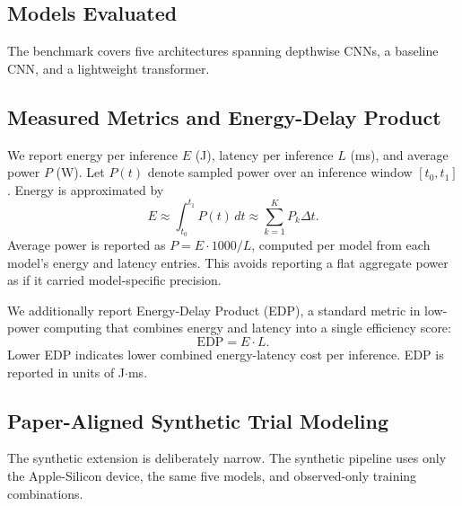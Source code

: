 \documentclass[conference]{IEEEtran}
\begin{document}
\subsection{Models Evaluated}
The benchmark covers five architectures spanning depthwise CNNs, a baseline
CNN, and a lightweight transformer.

\begin{table}[ht]
\centering
\caption{Architectures evaluated.}
\end{table}

\subsection{Measured Metrics and Energy-Delay Product}
We report energy per inference $E$ (J), latency per inference $L$ (ms), and
average power $P$ (W). Let $P(t)$ denote sampled power over an inference window
$[t_0, t_1]$. Energy is approximated by
\begin{equation}
E \approx \int_{t_0}^{t_1} P(t)\,dt \approx \sum_{k=1}^{K} P_k \Delta t.
\end{equation}
Average power is reported as $P = E \cdot 1000 / L$, computed per model from
each model's energy and latency entries. This avoids reporting a flat aggregate
power as if it carried model-specific precision.

We additionally report Energy-Delay Product (EDP), a standard metric in
low-power computing \cite{horowitz2014} that combines energy and latency into
a single efficiency score:
\begin{equation}
\text{EDP} = E \cdot L.
\end{equation}
Lower EDP indicates lower combined energy-latency cost per inference. EDP is
reported in units of J$\cdot$ms.

\subsection{Paper-Aligned Synthetic Trial Modeling}
The synthetic extension is deliberately narrow. The synthetic pipeline uses
only the Apple-Silicon device, the same five models, and observed-only
training combinations.
\end{document}
